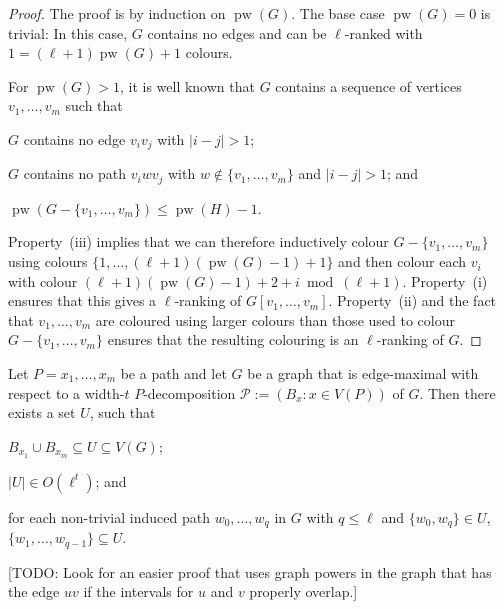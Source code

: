 \documentclass[kpfonts]{patmorin}
\DeclareMathOperator{\pw}{pw}
\theoremstyle{named}
\begin{document}
\begin{proof}
    The proof is by induction on $\pw(G)$.  The base case $\pw(G)=0$ is trivial: In this case, $G$ contains no edges and can be $\ell$-ranked with $1 = (\ell+1)\pw(G)+1$ colours.

    For $\pw(G)>1$, it is well known that $G$ contains a sequence of vertices $v_1,\ldots,v_m$  such that
    \begin{inparaenum}[(i)]
        \item $G$ contains no edge $v_iv_j$ with $|i-j|>1$;
        \item $G$ contains no path $v_iw v_j$ with $w\not\in\{v_1,\ldots,v_m\}$ and $|i-j|>1$; and
        \item $\pw(G-\{v_1,\ldots,v_m\})\le \pw(H)-1$.
    \end{inparaenum}
    Property~(iii) implies that we can therefore inductively colour $G-\{v_1,\ldots,v_m\}$ using colours $\{1,\ldots,(\ell+1)(\pw(G)-1)+1\}$ and then colour each $v_i$ with colour $(\ell+1)(\pw(G)-1)+2+i\bmod (\ell+1)$.  Property~(i) ensures that this gives a $\ell$-ranking of $G[v_1,\ldots,v_m]$.  Property~(ii) and the fact that $v_1,\ldots,v_m$ are coloured using larger colours than those used to colour $G-\{v_1,\ldots,v_m\}$ ensures that the resulting colouring is an $\ell$-ranking of $G$.
\end{proof}

\begin{lem}\label{path-induced}
    Let $P=x_1,\ldots,x_m$ be a path and let $G$ be a graph that is edge-maximal with respect to a width-$t$ $P$-decomposition $\mathcal{P}:=(B_x:x\in V(P))$ of $G$.  Then there exists a set $U$, such that
    \begin{compactenum}[(Z1)]
        \item $B_{x_1}\cup B_{x_m}\subseteq U \subseteq V(G)$;\label{values-u}
        \item $|U|\in O(\ell^t)$; and \label{size-u}
        \item for each non-trivial induced path $w_0,\ldots,w_q$ in $G$ with $q\le\ell$ and $\{w_0,w_q\}\in U$,  $\{w_1,\ldots,w_{q-1}\}\subseteq U$.\label{induced-u}
    \end{compactenum}
\end{lem}

[TODO: Look for an easier proof that uses graph powers in the graph that has the edge $uv$ if the intervals for $u$ and $v$ properly overlap.]
\end{document}
